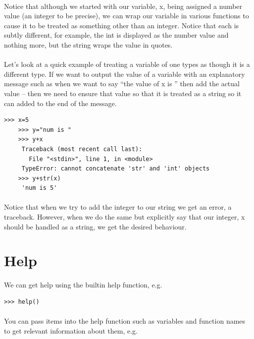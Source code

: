 \documentclass[12pt, a4paper, oneside]{book}
\begin{document}
\paragraph{} Notice that although we started with our variable, x, being assigned a number value (an integer to be precise), we can wrap our variable in various functions to cause it to be treated as something other than an integer. Notice that each is subtly different, for example, the int is displayed as the number value and nothing more, but the string wraps the value in quotes.

\paragraph{} Let's look at a quick example of treating a variable of one types as though it is a different type. If we want to output the value of a variable with an explanatory message such as when we want to say ``the value of x is '' then add the actual value -- then we need to ensure that value so that it is treated as a string so it can added to the end of the message.

\begin{lstlisting}[style=DOS]
    >>> x=5
    >>> y="num is "
    >>> y+x
     Traceback (most recent call last):
       File "<stdin>", line 1, in <module>
     TypeError: cannot concatenate 'str' and 'int' objects
    >>> y+str(x)
     'num is 5'
\end{lstlisting}

\paragraph{} Notice that when we try to add the integer to our string we get an error, a traceback. However, when we do the same but explicitly say that our integer, x should be handled as a string, we get the desired behaviour.

\section{Help}
\label{help}
\paragraph{} We can get help using the builtin help function, e.g.

\begin{lstlisting}[style=DOS]
    >>> help()
\end{lstlisting}
\paragraph{} You can pass items into the help function such as variables and function names to get relevant information about them, e.g.
\end{document}

